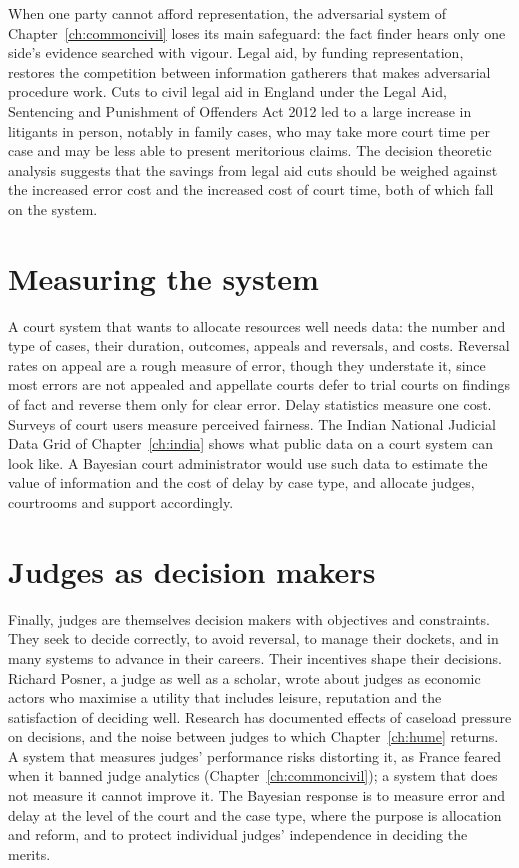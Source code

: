 When one party cannot afford representation, the adversarial system of Chapter~\ref{ch:commoncivil} loses its main safeguard: the fact finder hears only one side's evidence searched with vigour. Legal aid, by funding representation, restores the competition between information gatherers that makes adversarial procedure work. Cuts to civil legal aid in England under the Legal Aid, Sentencing and Punishment of Offenders Act 2012 led to a large increase in litigants in person, notably in family cases, who may take more court time per case and may be less able to present meritorious claims. The decision theoretic analysis suggests that the savings from legal aid cuts should be weighed against the increased error cost and the increased cost of court time, both of which fall on the system.

\section{Measuring the system}

A court system that wants to allocate resources well needs data: the number and type of cases, their duration, outcomes, appeals and reversals, and costs. Reversal rates on appeal are a rough measure of error, though they understate it, since most errors are not appealed and appellate courts defer to trial courts on findings of fact and reverse them only for clear error. Delay statistics measure one cost. Surveys of court users measure perceived fairness. The Indian National Judicial Data Grid of Chapter~\ref{ch:india} shows what public data on a court system can look like. A Bayesian court administrator would use such data to estimate the value of information and the cost of delay by case type, and allocate judges, courtrooms and support accordingly.

\section{Judges as decision makers}

Finally, judges are themselves decision makers with objectives and constraints. They seek to decide correctly, to avoid reversal, to manage their dockets, and in many systems to advance in their careers. Their incentives shape their decisions. Richard Posner, a judge as well as a scholar, wrote about judges as economic actors who maximise a utility that includes leisure, reputation and the satisfaction of deciding well. Research has documented effects of caseload pressure on decisions, and the noise between judges to which Chapter~\ref{ch:hume} returns. A system that measures judges' performance risks distorting it, as France feared when it banned judge analytics (Chapter~\ref{ch:commoncivil}); a system that does not measure it cannot improve it. The Bayesian response is to measure error and delay at the level of the court and the case type, where the purpose is allocation and reform, and to protect individual judges' independence in deciding the merits.

